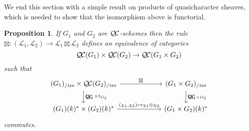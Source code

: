 \documentclass[11pt]{amsart}
\theoremstyle{plain}
\newtheorem{proposition}[theorem]{Proposition}
\theoremstyle{definition}
\theoremstyle{remark}
\newcommand{\Fq}{k}
\newcommand{\qcs}[1]{{\mathcal{#1}}}
\newcommand{\QC}{{\mathcal{Q\hskip-0.8pt C}}}
\newcommand{\QCiso}[1]{\QC(#1)_{/\textit{iso}}}
\newcommand{\trFrob}[1]{t_{#1}}
\begin{document}

We end this section with a simple result on products of quasicharacter sheaves,
which is needed to show that the isomorphism above is functorial.

\begin{proposition}\label{prop:product}
If $G_1$ and $G_2$ are $\QC$-schemes then the rule $\boxtimes : (\qcs{L}_1,\qcs{L}_2)\to \qcs{L}_1\boxtimes\qcs{L}_2$ defines an equivalence of categories 
\[
\QC(G_1)\times \QC(G_2) \to \QC(G_1\times G_2)
\]
such that 
\[
\begin{tikzcd}[column sep=60]
\arrow{d}{\trFrob{G_1} \times \trFrob{G_2}} \QCiso{G_1}\times \QCiso{G_2} \arrow{r}{\boxtimes}
& \arrow{d}{\trFrob{G_1\times G_2}} \QCiso{G_1\times G_2}\\
(G_1)(\Fq)^*\times (G_2)(\Fq)^* \arrow{r}{(\chi_1,\chi_2)\mapsto \chi_1\otimes \chi_2}  & (G_1\times G_2)(\Fq)^*
\end{tikzcd}
\]
commutes.
\end{proposition}
\end{document}
